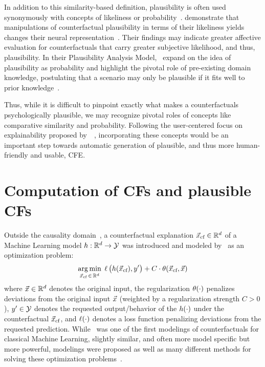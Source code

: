 In addition to this similarity-based definition, plausibility is often used synonymously with concepts of likeliness or probability~\citep{pezdek_is_2006, de_brigard_remembering_2013}. 
\citeauthor{de_brigard_remembering_2013} demonstrate that manipulations of counterfactual plausibility in terms of their likeliness yields changes their neural representation~\citep{de_brigard_remembering_2013}.
Their findings may indicate greater affective evaluation for counterfactuals that carry greater subjective likelihood, and thus, plausibility.
In their Plausibility Analysis Model,~\citeauthor{connell_model_2006} expand on the idea of plausibility as probability and highlight the pivotal role of pre-existing domain knowledge, postulating that a scenario may only be plausible if it fits well to prior knowledge~\citep{connell_model_2006}.

Thus, while it is difficult to pinpoint exactly what makes a counterfactuals psychologically plausible, we may recognize pivotal roles of concepts like comparative similarity and probability.
Following the user-centered focus on explainability proposed by~\citeauthor{miller_explanation_2019}~\citep{miller_explanation_2019}, incorporating these concepts would be an important step towards automatic generation of plausible, and thus more human-friendly and usable, \gls{CFE}.

\section{Computation of CFs and plausible CFs}\label{sec:EffCompCFs}
Outside the causality domain~\citep{halpern_causes_2020,karimi_survey_2020}, a counterfactual explanation ${\vec{x}_{\text{cf}}}\in\mathbb{R}^d$ of a Machine Learning model $h:\mathbb{R}^d\to\mathcal{Y}$ was introduced and modeled by~\citep{wachter_counterfactual_2017} as an optimization problem:
\begin{equation}\label{eq:counterfactual_opt_original}
\underset{{\vec{x}_{\text{cf}}} \,\in\, \mathbb{R}^d}{\arg\min}\; \operatorname*{{\ell}}\big(h({\vec{x}_{\text{cf}}}), y'\big) + C \cdot \operatorname*{{\theta}}({\vec{x}_{\text{cf}}}, \vec{x})
\end{equation}
where $\vec{x}\in\mathbb{R}^d$ denotes the original input, the regularization $\operatorname*{{\theta}}(\cdot)$ penalizes deviations from the original input $\vec{x}$ (weighted by a regularization strength $C>0$), $y'\in\mathcal{Y}$ denotes the requested output/behavior of the $h(\cdot)$ under the counterfactual ${\vec{x}_{\text{cf}}}$, and $\operatorname*{{\ell}}(\cdot)$ denotes a loss function penalizing deviations from the requested prediction.
While~ was one of the first modelings of counterfactuals for classical Machine Learning, slightly similar, and often more model specific but more powerful, modelings were proposed as well as many different methods for solving these optimization problems~\citep{verma_counterfactual_2020,artelt_counterfactuals_survey_2019,karimi_survey_2020}.


